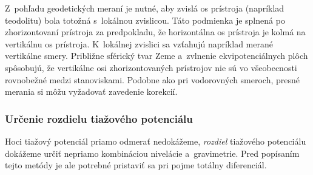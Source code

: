 \documentclass[a4paper,12pt]{book}
\begin{document}
Z~pohľadu geodetických meraní je nutné, aby zvislá os prístroja (napríklad 
teodolitu) bola totožná s~lokálnou zvislicou.  Táto podmienka je splnená po 
zhorizontovaní prístroja za predpokladu, že horizontálna os prístroja je kolmá 
na vertikálnu os prístroja.  K~lokálnej zvislici sa vzťahujú napríklad merané 
vertikálne smery.  Približne sférický tvar Zeme a~zvlnenie ekvipotenciálnych 
plôch spôsobujú, že vertikálne osi zhorizontovaných prístrojov nie sú vo 
všeobecnosti rovnobežné medzi stanoviskami.  Podobne ako pri vodorovných 
smeroch, presné merania si môžu vyžadovať zavedenie korekcií.

\subsubsection{Určenie rozdielu tiažového potenciálu}
\label{sec:potential_differences}

Hoci tiažový potenciál priamo odmerať nedokážeme, \emph{rozdiel} tiažového 
potenciálu dokážeme určiť nepriamo kombináciou nivelácie a~gravimetrie.  Pred 
popísaním tejto metódy je ale potrebné pristaviť sa pri pojme totálny 
diferenciál.
\end{document}
